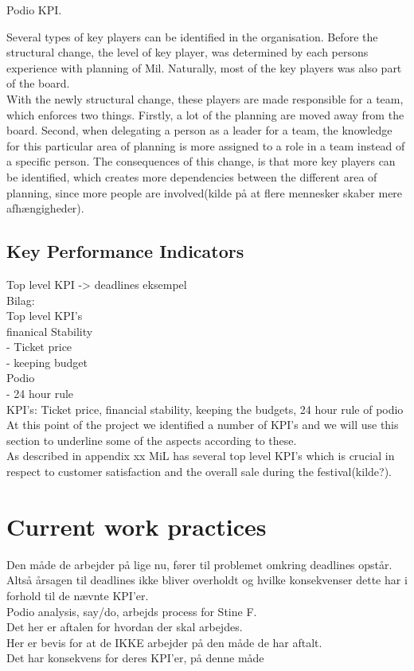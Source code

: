 Podio KPI.

Several types of key players can be identified in the organisation. Before the structural change, the level of key player, was determined by each persons experience with planning of Mil. Naturally, most of the key players was also part of the board.\\
With the newly structural change, these players are made responsible for a team, which enforces two things. Firstly, a lot of the planning are moved away from the board. Second, when delegating a person as a leader for a team, the knowledge for this particular area of planning is more assigned to a role in a team instead of a specific person. The consequences of this change, is that more key players can be identified, which creates more dependencies between the different area of planning, since more people are involved(kilde på at flere mennesker skaber mere afhængigheder).\\


\subsection{Key Performance Indicators}
Top level KPI -> deadlines eksempel\\

Bilag:\\
Top level KPI's\\
finanical Stability\\
	- Ticket price\\
	- keeping budget\\
Podio\\
- 24 hour rule\\

KPI's: Ticket price, financial stability, keeping the budgets, 24 hour rule of podio\\

At this point of the project we identified a number of KPI's and we will use this section to underline some of the aspects according to these.\\
As described in appendix xx MiL has several top level KPI's which is crucial in respect to customer satisfaction and the overall sale during the festival(kilde?). 

\section{Current work practices}
Den måde de arbejder på lige nu, fører til problemet omkring deadlines opstår. Altså årsagen til deadlines ikke bliver overholdt og hvilke konsekvenser dette har i forhold til de nævnte KPI'er. \\
Podio analysis, say/do, arbejds process for Stine F.\\
Det her er aftalen for hvordan der skal arbejdes.\\
Her er bevis for at de IKKE arbejder på den måde de har aftalt.\\
Det har konsekvens for deres KPI'er, på denne måde\\

